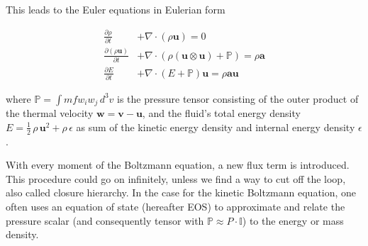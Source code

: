 This leads to the Euler equations in Eulerian form

\begin{align}
  \frac{\partial \rho}{\partial t} &+ \nabla\cdot (\rho\textbf{u})= 0 \label{eq:EulerMass} \\
  \frac{\partial (\rho\textbf{u})}{\partial t} &+ \nabla\cdot (\rho(\textbf{u} \otimes \textbf{u}) + \mathbb{P}) = \rho \textbf{a} \label{eq:EulerMomentum}\\
  \frac{\partial E}{\partial t} &+ \nabla \cdot (E + \mathbb{P}) \textbf{u} = \rho \textbf{a} \textbf{u} \label{eq:EulerEnergy}
\end{align}

where $\mathbb{P} = \int m f w_{i} w_{j}\,d^{3}v$ is the pressure tensor consisting of the outer product of the thermal velocity $\textbf{w} = \textbf{v} - \textbf{u}$, and the fluid's total energy density $E = \frac{1}{2}\,\rho\,\textbf{u}^{2} + \rho\,\epsilon$ as sum of the kinetic energy density and internal energy density $\epsilon$.

With every moment of the Boltzmann equation, a new flux term is introduced.
This procedure could go on infinitely, unless we find a way to cut off the loop, also called closure hierarchy.
In the case for the kinetic Boltzmann equation, one often uses an equation of state (hereafter EOS) to approximate and relate the pressure scalar (and consequently tensor with $\mathbb{P} \approx P\cdot\mathbb{I}$) to the energy or mass density.

